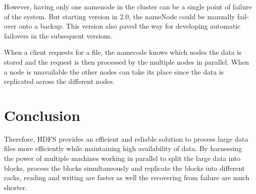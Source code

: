 However, having only one namenode in the cluster can be a single point
of failure of the system. But starting version in 2.0, the nameNode
could be manually fail-over onto a backup. This version also paved the
way for developing automatic failovers in the subsequent versions.

When a client requests for a file, the namecode knows which nodes the
data is stored and the request is then processed by the multiple nodes
in parallel. When a node is unavailable the other nodes can take its
place since the data is replicated across the different nodes.

\section {Conclusion}

Therefore, HDFS provides an efficient and reliable solution to process
large data files more efficiently while maintaining high availability
of data. By harnessing the power of multiple machines working in
parallel to split the large data into blocks, process the blocks
simultaneously and replicate the blocks into different racks, reading
and writing are faster as well the recovering from failure are much
shorter.


 